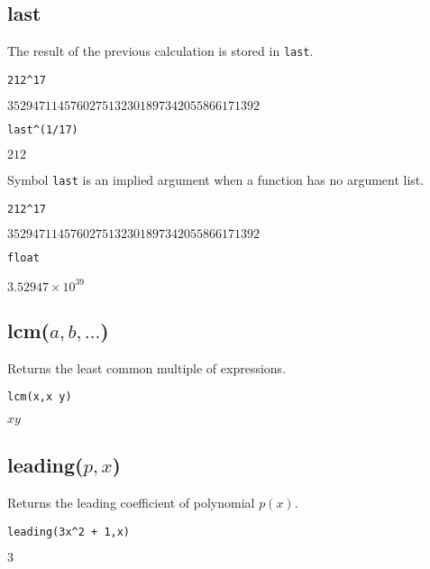\subsection*{last}

The result of the previous calculation is stored in {\tt last}.

{\color{blue}
\begin{verbatim}
212^17
\end{verbatim}
}

\noindent
$3529471145760275132301897342055866171392$

{\color{blue}
\begin{verbatim}
last^(1/17)
\end{verbatim}
}

\noindent
$212$

\bigskip
\noindent
Symbol {\tt last} is an implied argument when a function has no argument list.

{\color{blue}
\begin{verbatim}
212^17
\end{verbatim}
}

\noindent
$3529471145760275132301897342055866171392$

{\color{blue}
\begin{verbatim}
float
\end{verbatim}
}

\noindent
$\displaystyle 3.52947\times10^{39}$

\subsection*{lcm($a,b,\ldots$)}

Returns the least common multiple of expressions.

{\color{blue}
\begin{verbatim}
lcm(x,x y)
\end{verbatim}
}

\noindent
$xy$

\subsection*{leading($p,x$)}

Returns the leading coefficient of polynomial $p(x)$.

{\color{blue}
\begin{verbatim}
leading(3x^2 + 1,x)
\end{verbatim}
}

\noindent
$3$

